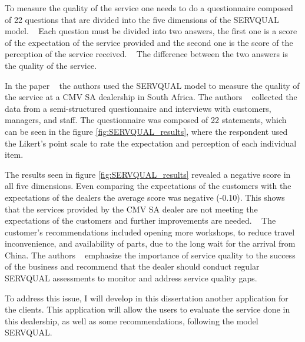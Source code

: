 To measure the quality of the service one needs to do a questionnaire composed of 22 questions that are divided into the five dimensions of the SERVQUAL model. ~\cite{Measuring_After_sales_Service_Quality}
Each question must be divided into two answers, the first one is a score of the expectation of the service provided and the second one is the score of the perception of the service received. ~\cite{Measuring_After_sales_Service_Quality}
The difference between the two answers is the quality of the service. ~\cite{servqual_blog_da_qualidade} ~\cite{Measuring_After_sales_Service_Quality} ~\cite{SERVQUAL_OLD}

In the paper ~\citet{Measuring_After_sales_Service_Quality} the authors used the SERVQUAL model to measure the quality of the service at a CMV SA dealership in South Africa.
The authors ~\citet{Measuring_After_sales_Service_Quality} collected the data from a semi-structured questionnaire and interviews with customers, managers, and staff.
The questionnaire was composed of 22 statements, which can be seen in the figure \ref{fig:SERVQUAL_results}, where the respondent used the Likert's point scale to rate the expectation and perception of each individual item.

The results seen in figure \ref{fig:SERVQUAL_results} revealed a negative score in all five dimensions. 
Even comparing the expectations of the customers with the expectations of the dealers the average score was negative (-0.10).
This shows that the services provided by the CMV SA dealer are not meeting the expectations of the customers and further improvements are needed. ~\cite{Measuring_After_sales_Service_Quality}
The customer's recommendations included opening more workshops, to reduce travel inconvenience, and availability of parts, due to the long wait for the arrival from China.
The authors ~\citet{Measuring_After_sales_Service_Quality} emphasize the importance of service quality to the success of the business and recommend that the dealer should conduct regular SERVQUAL assessments to monitor and address service quality gaps. ~\cite{Measuring_After_sales_Service_Quality}

To address this issue, I will develop in this dissertation another application for the clients. 
This application will allow the users to evaluate the service done in this dealership, as well as some recommendations, following the model SERVQUAL. 

